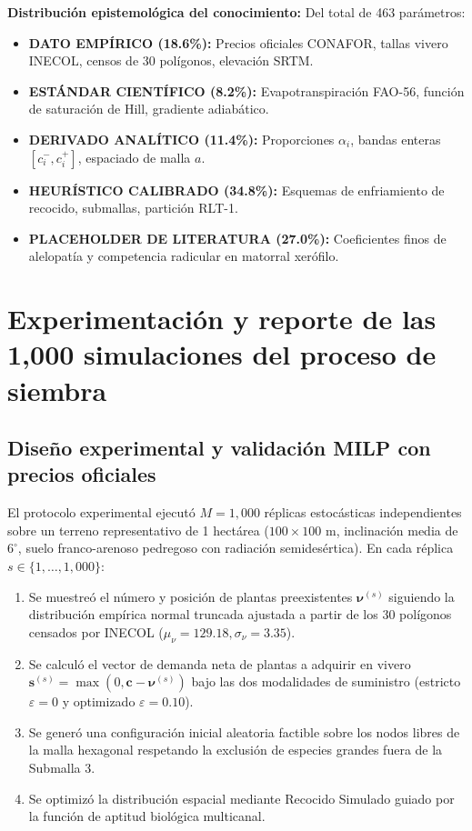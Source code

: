 \documentclass[11pt,a4paper]{article}
\begin{document}
\textbf{Distribución epistemológica del conocimiento:} Del total de 463 parámetros:
\begin{itemize}[leftmargin=1.5em]
    \item \textbf{DATO EMPÍRICO (18.6\%):} Precios oficiales CONAFOR, tallas vivero INECOL, censos de 30 polígonos, elevación SRTM.
    \item \textbf{ESTÁNDAR CIENTÍFICO (8.2\%):} Evapotranspiración FAO-56, función de saturación de Hill, gradiente adiabático.
    \item \textbf{DERIVADO ANALÍTICO (11.4\%):} Proporciones $\alpha_i$, bandas enteras $[c_i^-, c_i^+]$, espaciado de malla $a$.
    \item \textbf{HEURÍSTICO CALIBRADO (34.8\%):} Esquemas de enfriamiento de recocido, submallas, partición RLT-1.
    \item \textbf{PLACEHOLDER DE LITERATURA (27.0\%):} Coeficientes finos de alelopatía y competencia radicular en matorral xerófilo.
\end{itemize}

\section{Experimentación y reporte de las 1,000 simulaciones del proceso de siembra}

\subsection{Diseño experimental y validación MILP con precios oficiales}
El protocolo experimental ejecutó $M = 1,000$ réplicas estocásticas independientes sobre un terreno representativo de 1 hectárea ($100\times 100\text{ m}$, inclinación media de $6^\circ$, suelo franco-arenoso pedregoso con radiación semidesértica). En cada réplica $s \in \{1, \dots, 1,000\}$:
\begin{enumerate}[leftmargin=1.5em]
    \item Se muestreó el número y posición de plantas preexistentes $\boldsymbol{\nu}^{(s)}$ siguiendo la distribución empírica normal truncada ajustada a partir de los 30 polígonos censados por INECOL ($\mu_\nu = 129.18, \sigma_\nu = 3.35$).
    \item Se calculó el vector de demanda neta de plantas a adquirir en vivero $\mathbf{s}^{(s)} = \max(0, \mathbf{c} - \boldsymbol{\nu}^{(s)})$ bajo las dos modalidades de suministro (estricto $\varepsilon=0$ y optimizado $\varepsilon=0.10$).
    \item Se generó una configuración inicial aleatoria factible sobre los nodos libres de la malla hexagonal respetando la exclusión de especies grandes fuera de la Submalla 3.
    \item Se optimizó la distribución espacial mediante Recocido Simulado guiado por la función de aptitud biológica multicanal.
\end{enumerate}
\end{document}
